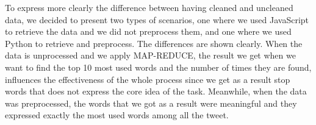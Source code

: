 \documentclass{article}
\begin{document}
To express more clearly the difference between having cleaned and uncleaned data, we decided to present two types of scenarios, one where we used JavaScript to retrieve the data and we did not preprocess them, and one where we used Python to retrieve and preprocess. The differences are shown clearly. When the data is unprocessed and we apply MAP-REDUCE, the result we get when we want to find the top 10 most used words and the number of times they are found, influences the effectiveness of the whole process since we get as a result stop words that does not express the core idea of the task. Meanwhile, when the data was preprocessed, the words that we got as a result were meaningful and they expressed exactly the most used words among all the tweet.


      
    
    
    \nocite{*}
\end{document}
